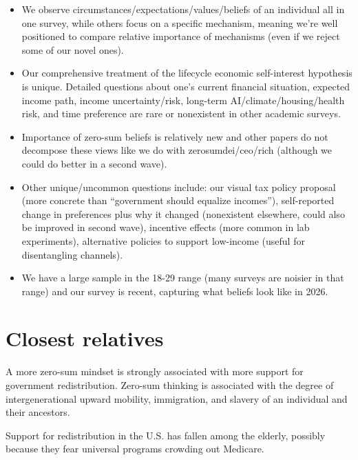 \documentclass{article}
\newcommand{\citeh}[1]{\noindent \textbf{\cite*{#1}}}
\newcommand{\citem}[1]{\medskip \noindent \textbf{\cite*{#1}}}
\begin{document}
\begin{itemize}
    \item We observe circumstances/expectations/values/beliefs of an individual all in one survey, while others focus on a specific mechanism, meaning we're well positioned to compare relative importance of mechanisms (even if we reject some of our novel ones). 
    \item Our comprehensive treatment of the lifecycle economic self-interest hypothesis is unique. Detailed questions about one's current financial situation, expected income path, income uncertainty/risk, long-term AI/climate/housing/health risk, and time preference are rare or nonexistent in other academic surveys.
    \item Importance of zero-sum beliefs is relatively new and other papers do not decompose these views like we do with zerosumdei/ceo/rich (although we could do better in a second wave).
    \item Other unique/uncommon questions include: our visual tax policy proposal (more concrete than ``government should equalize incomes''), self-reported change in preferences plus why it changed (nonexistent elsewhere, could also be improved in second wave), incentive effects (more common in lab experiments), alternative policies to support low-income (useful for disentangling channels).
    \item We have a large sample in the 18-29 range (many surveys are noisier in that range) and our survey is recent, capturing what beliefs look like in 2026.
\end{itemize}




\section*{Closest relatives}

\citeh{chinoy2026zero}

A more zero-sum mindset is strongly associated with more support for government redistribution. Zero-sum thinking is associated with the degree of intergenerational upward mobility, immigration, and slavery of an individual and their ancestors.

\citem{ashok2015support}

Support for redistribution in the U.S. has fallen among the elderly, possibly because they fear universal programs crowding out Medicare.

\citem{davidai2019politics}
\end{document}

